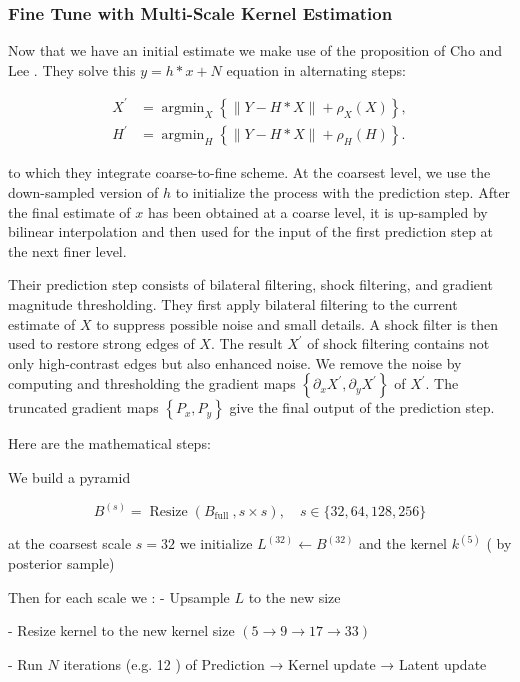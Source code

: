 \documentclass{article}
\theoremstyle{definition}
\begin{document}
\subsubsection{Fine Tune with Multi-Scale Kernel Estimation}

Now that we have an initial estimate we make use of the proposition of Cho and Lee \cite{cho-fast}. They solve this $y=h * x+N$ equation in alternating steps:

$$
\begin{aligned}
X^{\prime} & =\operatorname{argmin}_X\left\{\|Y-H * X\|+\rho_X(X)\right\}, \\
H^{\prime} & =\operatorname{argmin}_H\left\{\|Y-H * X\|+\rho_H(H)\right\} .
\end{aligned}
$$

to which they integrate coarse-to-fine scheme. At the coarsest level, we use the down-sampled version of $h$ to initialize the process with the prediction step. After the final estimate of $x$ has been obtained at a coarse level, it is up-sampled by bilinear interpolation and then used for the input of the first prediction step at the next finer level.

Their prediction step consists of bilateral filtering, shock filtering, and gradient magnitude thresholding. They first apply bilateral filtering  to the current estimate of $X$ to suppress possible noise and small details. A shock filter is then used to restore strong edges of $X$. The result $X^{\prime}$ of shock filtering contains not only high-contrast edges but also enhanced noise. We remove the noise by computing and thresholding the gradient maps $\left\{\partial_x X^{\prime}, \partial_y X^{\prime}\right\}$ of $X^{\prime}$. The truncated gradient maps $\left\{P_x, P_y\right\}$ give the final output of the prediction step.


Here are the mathematical steps:

We build a pyramid 

$$
B^{(s)}=\operatorname{Resize}\left(B_{\text {full }}, s \times s\right), \quad s \in\{32, 64, 128, 256\}
$$

at the coarsest scale $s=32$ we initialize $L^{(32)} \leftarrow B^{(32)}$ and the kernel $k^{(5)}$ ( by posterior sample) 

Then for each scale we
:
- Upsample $L$ to the new size

- Resize kernel to the new kernel size $(5 \rightarrow 9 \rightarrow 17 \rightarrow 33)$

- Run $N$ iterations (e.g. 12 ) of Prediction → Kernel update → Latent update
\end{document}
